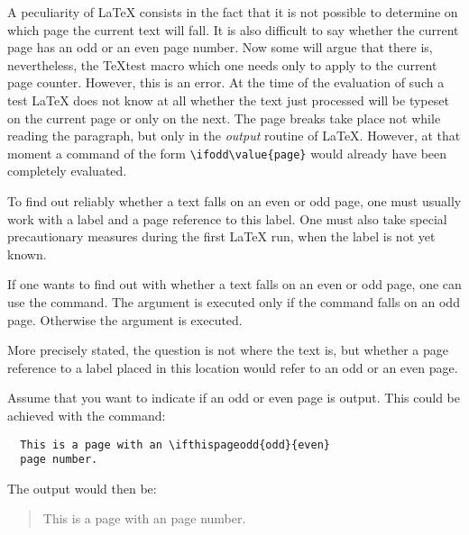 \begin{Declaration}
    
\end{Declaration}%
%
%
\begin{Explain}%
  A peculiarity of \LaTeX{} consists in the fact that it is not
  possible to determine on which page the current text will fall. It
  is also difficult to say whether the current page has an odd or an
  even page number. Now some will argue that there is, nevertheless,
  the \TeX test macro  which one needs only to apply to
  the current page counter. However, this is an error. At the time of
  the evaluation of such a test \LaTeX{} does not know at all whether
  the text just processed will be typeset on the current page or only
  on the next. The page breaks take place not while reading the paragraph,
  but only in the \emph{output} routine of \LaTeX{}. However, at that
  moment a command of the form \verb|\ifodd\value{page}| would already
  have been completely evaluated.

  To find out reliably whether a text falls on an even or odd
  page, one must usually work with a label and a page reference to
  this label. One must also take special precautionary measures during
  the first \LaTeX{} run, when the label is not yet known.
\end{Explain}
If one wants to find out with {\KOMAScript} whether a text falls on an
even or odd page, one can use the  command. The
 argument is executed only if the command falls on an odd
page.  Otherwise the  argument is executed.

\begin{Explain}
  More precisely stated, the question is not where the text is, but
  whether a page reference to a label placed in this location would
  refer to an odd or an even page.
\end{Explain}
\begin{Example}
  Assume that you want to indicate if an odd or even page is
  output. This could be achieved with the command:
\begin{lstlisting}
  This is a page with an \ifthispageodd{odd}{even}
  page number.
\end{lstlisting}
  The output would then be:
  \begin{quote}
    This is a page with an 
    page number.
  \end{quote}
\end{Example}

